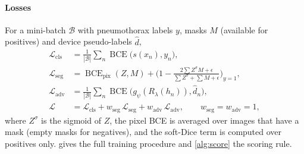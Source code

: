 \documentclass{ieeeaccess}
\DeclareMathOperator{\BCE}{BCE}
\begin{document}
\paragraph{Losses}
For a mini-batch $\mathcal{B}$ with pneumothorax labels $y$, masks $M$ (available for positives) and device pseudo-labels $\hat d$,
\begin{align}
\mathcal{L}_{\text{cls}} &= \tfrac{1}{|\mathcal{B}|}\textstyle\sum_{n}\BCE\big(s(x_n),y_n\big), \label{eq:lcls}\\
\mathcal{L}_{\text{seg}} &= \BCE_{\text{pix}}(Z,M) + \Big(1-\frac{2\sum Z^\sigma M + \epsilon}{\sum Z^\sigma + \sum M + \epsilon}\Big)_{y=1}, \label{eq:lseg}\\
\mathcal{L}_{\text{adv}} &= \tfrac{1}{|\mathcal{B}|}\textstyle\sum_n\BCE\big(g_\psi(R_\lambda(h_n)),\hat d_n\big), \label{eq:ladv}\\
\mathcal{L} &= \mathcal{L}_{\text{cls}} + w_{\text{seg}}\,\mathcal{L}_{\text{seg}} + w_{\text{adv}}\,\mathcal{L}_{\text{adv}},\qquad w_{\text{seg}}=w_{\text{adv}}=1, \label{eq:ltotal}
\end{align}
where $Z^\sigma$ is the sigmoid of $Z$, the pixel BCE is averaged over images that have a mask (empty masks for negatives), and the soft-Dice term is computed over positives only.  gives the full training procedure and \cref{alg:score} the scoring rule.
\end{document}
